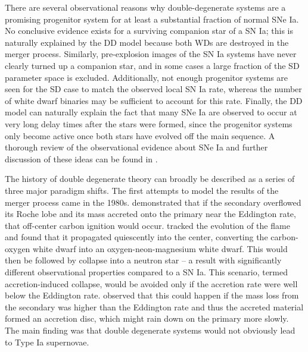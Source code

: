 \documentclass[12pt,preprint]{aastex}
\begin{document}
There are several observational reasons why double-degenerate systems are a promising progenitor system for at least a substantial fraction of normal SNe Ia. No conclusive evidence exists for a surviving companion star of a SN Ia; this is naturally explained by the DD model because both WDs are destroyed in the merger process. Similarly, pre-explosion images of the SN Ia systems have never clearly turned up a companion star, and in some cases a large fraction of the SD parameter space is excluded. Additionally, not enough progenitor systems are seen for the SD case to match the observed local SN Ia rate, whereas the number of white dwarf binaries may be sufficient to account for this rate. Finally, the DD model can naturally explain the fact that many SNe Ia are observed to occur at very long delay times after the stars were formed, since the progenitor systems only become active once both stars have evolved off the main sequence. A thorough review of the observational evidence about SNe Ia and further discussion of these ideas can be found in \cite{maoz:2014}.  

The history of double degenerate theory can broadly be described as a series of three major paradigm shifts. The first attempts to model the results of the merger process came in the 1980s. \cite{nomotoiben:1985} demonstrated that if the secondary overflowed its Roche lobe and its mass accreted onto the primary near the Eddington rate, that off-center carbon ignition would occur. \cite{saionomoto:1985} tracked the evolution of the flame and found that it propagated quiescently into the center, converting the carbon-oxygen white dwarf into an oxygen-neon-magnesium white dwarf. This would then be followed by collapse into a neutron star -- a result with significantly different observational properties compared to a SN Ia. This scenario, termed accretion-induced collapse, would be avoided only if the accretion rate were well below the Eddington rate. \cite{tutukov_yungelson:1979} observed that this could happen if the mass loss from the secondary was higher than the Eddington rate and thus the accreted material formed an accretion disc, which might rain down on the primary more slowly. The main finding was that double degenerate systems would not obviously lead to Type Ia supernovae.
\end{document}
